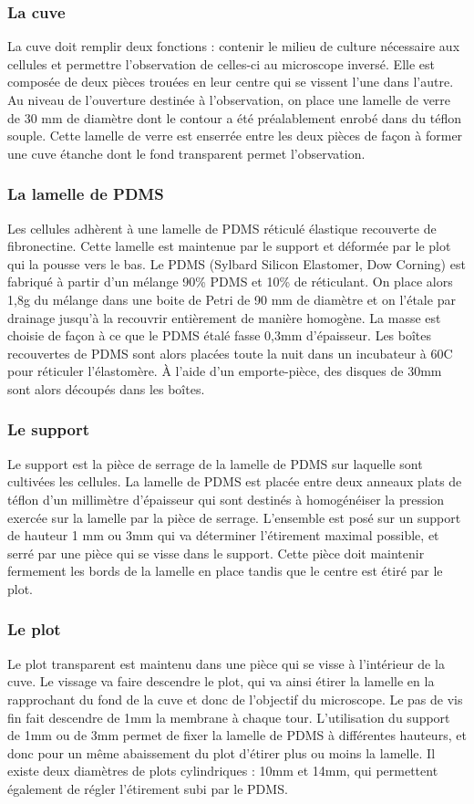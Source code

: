 	\subsubsection{La cuve}
	La cuve doit remplir deux fonctions : contenir le milieu de culture nécessaire aux cellules et permettre l'observation de celles-ci au microscope inversé. Elle est composée de deux pièces trouées en leur centre qui se vissent l'une dans l'autre. Au niveau de l'ouverture destinée à l'observation, on place une lamelle de verre de 30 mm de diamètre dont le contour a été préalablement enrobé dans du téflon souple. Cette lamelle de verre est enserrée entre les deux pièces de façon à former une cuve étanche dont le fond transparent permet l'observation.
	\subsubsection{La lamelle de PDMS} 
	Les cellules adhèrent à une lamelle de PDMS réticulé élastique recouverte de fibronectine. Cette lamelle est maintenue par le support et déformée par le plot qui la pousse vers le bas. 
	Le PDMS (Sylbard Silicon Elastomer, Dow Corning) est fabriqué à partir d'un mélange 90\% PDMS et 10\% de réticulant. On place alors 1,8g du mélange dans une boite de Petri de 90 mm de diamètre et on l'étale par drainage jusqu'à la recouvrir entièrement de manière homogène. La masse est choisie de façon à ce que le PDMS étalé fasse 0,3mm d'épaisseur. Les boîtes recouvertes de PDMS sont alors placées toute la nuit dans un incubateur à 60\degres  C pour réticuler l'élastomère. À l'aide d'un emporte-pièce, des disques de 30mm sont alors découpés dans les boîtes.

		
	\subsubsection{Le support}
	Le support est la pièce de serrage de la lamelle de PDMS sur laquelle sont cultivées les cellules. La lamelle de PDMS est placée entre deux anneaux plats de téflon d'un millimètre d'épaisseur qui sont destinés à homogénéiser la pression exercée sur la lamelle par la pièce de serrage. L'ensemble est posé sur un support de hauteur 1 mm ou 3mm qui va déterminer l'étirement maximal possible, et serré par une pièce qui se visse dans le support. 
	Cette pièce doit maintenir fermement les bords de la lamelle en place tandis que le centre est étiré par le plot. 
	\subsubsection{Le plot}
	Le plot transparent est maintenu dans une pièce qui se visse à l'intérieur de la cuve. Le vissage va faire descendre le plot, qui va ainsi étirer la lamelle en la rapprochant du fond de la cuve et donc de l'objectif du microscope. Le pas de vis fin fait descendre de 1mm la membrane à chaque tour. 
	L'utilisation du support de 1mm ou de 3mm permet de fixer la lamelle de PDMS à différentes hauteurs, et donc pour un même abaissement du plot d'étirer plus ou moins la lamelle. Il existe deux diamètres de plots cylindriques : 10mm et 14mm, qui permettent également de régler l'étirement subi par le PDMS. 
